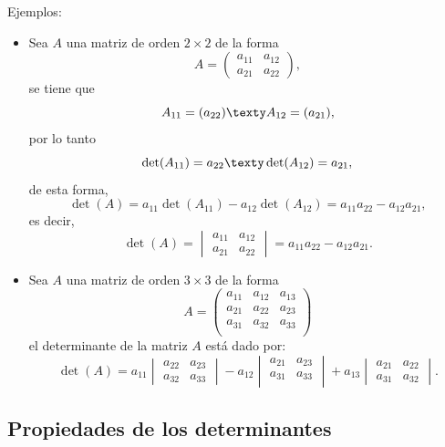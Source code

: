 \documentclass[a4,11pt]{aleph-notas}
\begin{document}
Ejemplos:
\begin{itemize}
\item 
    Sea $A$ una matriz de orden $2 \times 2$ de la forma
    \[ 
        A=
        \begin{pmatrix}
         a_{11} & a_{12}\\
         a_{21} & a_{22}
        \end{pmatrix},
    \]
    se tiene que
    \[
        A_{11} = (a_{22})
        \texty
        A_{12} = (a_{21}),
    \]
    por lo tanto
    \[
        \det(A_{11}) = a_{22}
        \texty
        \det(A_{12}) = a_{21},
    \]
    de esta forma,
    \[
        \det(A) = a_{11}\det(A_{11}) - a_{12}\det(A_{12})
            = a_{11}a_{22} - a_{12}a_{21},
    \]
    es decir,
    \[
        \det(A) = \begin{vmatrix}
        a_{11} & a_{12} \\
        a_{21} & a_{22}
        \end{vmatrix}
        = a_{11}a_{22} - a_{12}a_{21}.
    \]
\item Sea $A$ una matriz de orden $3 \times 3$ de la forma
         \[ A=
        \begin{pmatrix}
         a_{11} & a_{12} & a_{13}\\
         a_{21} & a_{22} & a_{23}\\
         a_{31} & a_{32} & a_{33}\\
        \end{pmatrix}
        \]
        \noindent el determinante de la matriz $A$ está dado por:
        \[
        \det(A) = a_{11}
        \begin{vmatrix}
        a_{22} & a_{23} \\
        a_{32} & a_{33}
        \end{vmatrix} - a_{12}
        \begin{vmatrix}
        a_{21} & a_{23} \\
        a_{31} & a_{33} \\
        \end{vmatrix}+ a_{13}
        \begin{vmatrix}
        a_{21} & a_{22} \\
        a_{31} & a_{32}
        \end{vmatrix}.
        \]
\end{itemize}

\subsection{Propiedades de los determinantes}
\end{document}
